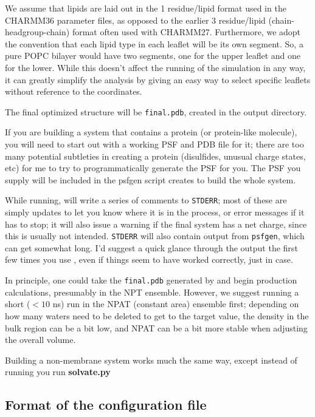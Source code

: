 \documentclass[12pt]{article}
\begin{document}
We assume that lipids are laid out in the 1 residue/lipid format
used in the CHARMM36 parameter files, as opposed to the earlier 3
residue/lipid (chain-headgroup-chain) format often used with CHARMM27.
Furthermore, we adopt the convention that each lipid type in each leaflet
will be its own segment.  So, a pure POPC bilayer would have two segments,
one for the upper leaflet and one for the lower.  While this doesn't affect
the running of the simulation in any way, it can greatly simplify the
analysis by giving an easy way to select specific leaflets without reference
to the coordinates.

The final optimized structure will be {\tt final.pdb}, created in the output
directory.

If you are building a system that contains a protein (or protein-like
molecule), you will need to start out with a working PSF and PDB file for
it; there are too many potential subtleties in creating a protein
(disulfides, unusual charge states, etc) for me to try to programmatically
generate the PSF for you.  The PSF you supply will be included in the
psfgen script {\omgwtf} creates to build the whole system.

While running, {\omgwtf} will write a series of comments to {\tt STDERR};
most of these are simply updates to let you know where it is in the
process, or error messages if it has to stop; it will also issue a warning
if the final system has a net charge, since this is usually not intended.
{\tt STDERR} will also contain output from {\tt psfgen}, which can get
somewhat long.  I'd suggest a quick glance through the output the first few
times you use {\omgwtf}, even if things seem to have worked correctly, just
in case.

In principle, one could take the {\tt final.pdb} generated by {\omgwtf} and
begin production calculations, presumably in the NPT ensemble.  However, we
suggest running a short ($<10$ ns) run in the NPAT (constant area) ensemble
first; depending on how many waters need to be deleted to get to the target
value, the density in the bulk region can be a bit low, and NPAT can be a
bit more stable when adjusting the overall volume.

Building a non-membrane system works much the same way, except instead of
running {\omgwtf} you run {\bf solvate.py}

\subsection{Format of the configuration file}
\label{ss:config}
\end{document}
